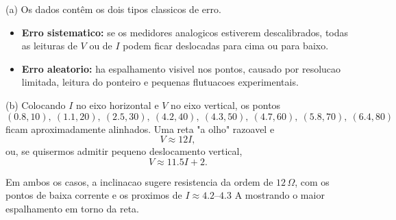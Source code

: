 (a) Os dados contêm os dois tipos classicos de erro.

\begin{itemize}
\item \textbf{Erro sistematico:} se os medidores analogicos estiverem descalibrados, todas as leituras de $V$ ou de $I$ podem ficar deslocadas para cima ou para baixo.
\item \textbf{Erro aleatorio:} ha espalhamento visivel nos pontos, causado por resolucao limitada, leitura do ponteiro e pequenas flutuacoes experimentais.
\end{itemize}

(b) Colocando $I$ no eixo horizontal e $V$ no eixo vertical, os pontos
\[(0.8,10),\ (1.1,20),\ (2.5,30),\ (4.2,40),\ (4.3,50),\ (4.7,60),\ (5.8,70),\ (6.4,80)\]
ficam aproximadamente alinhados. Uma reta "a olho" razoavel e
\[
V\approx 12I,
\]
ou, se quisermos admitir pequeno deslocamento vertical,
\[
V\approx 11.5I+2.
\]

Em ambos os casos, a inclinacao sugere resistencia da ordem de $12\,\Omega$, com os pontos de baixa corrente e os proximos de $I\approx4.2$--$4.3$ A mostrando o maior espalhamento em torno da reta.